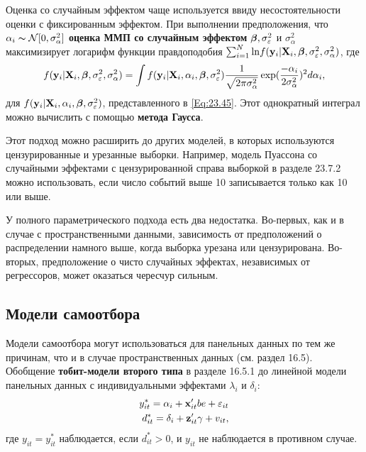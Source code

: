 Оценка со случайным эффектом чаще используется ввиду несостоятельности оценки с фиксированным эффектом. При выполнении предположения, что $\alpha_i \thicksim \mathcal{N} [0, \sigma^2_{\alpha}]$ \textbf{оценка ММП со случайным эффектом} $\bm{\beta}, \sigma^2_{\varepsilon}$ и $\sigma^2_{\alpha}$ максимизирует логарифм функции правдоподобия $\sum^N_{i=1} \mathrm{ln} f(\mathbf{y}_i |\mathbf{X}_i, \bm{\beta}, \sigma^2_{\varepsilon}, \sigma^2_{\alpha})$, где
\begin{align}
f(\mathbf{y}_i|\mathbf{X}_i, \bm{\beta}, \sigma^2_{\varepsilon}, \sigma^2_{\alpha})=
\int f(\mathbf{y}_i | \mathbf{X}_i, \alpha_i, \bm{\beta}, \sigma^2_{\varepsilon}) 
\frac{1}{\sqrt{2 \pi \sigma^2_{\alpha}}} \exp  (\frac{-\alpha_i}{2 \sigma^2_{\alpha}})^2 d \alpha_i,
\label{Eq:23.46}
\end{align}
для $f(\mathbf{y}_i |\mathbf{X}_i, \alpha_i, \bm{\beta}, \sigma^2_{\varepsilon})$, представленного в \ref{Eq:23.45}. Этот однократный интеграл можно вычислить с помощью \textbf{метода Гаусса}.

Этот подход можно расширить до других моделей, в которых используются цензурированные и урезанные выборки. Например, модель Пуассона со случайными эффектами с цензурированной справа выборкой в разделе 23.7.2 можно использовать, если число событий выше 10 записывается только как 10 или выше.

У полного параметрического подхода есть два недостатка. Во-первых, как и в случае с пространственными данными, зависимость от предположений о распределении намного выше, когда выборка урезана или цензурирована. Во-вторых, предположение о чисто случайных эффектах, независимых от регрессоров, может оказаться чересчур сильным. 

\subsection{Модели самоотбора}

Модели самоотбора могут использоваться для панельных данных по тем же причинам, что и в случае пространственных данных (см. раздел 16.5). Обобщение \textbf{тобит-модели второго типа} в разделе 16.5.1  до линейной модели панельных данных с индивидуальными эффектами $\lambda_i$ и $\delta_i$: 
\begin{align}
y^*_{it} = \alpha_i + \mathbf{x}'_{it} be +\varepsilon_{it} 
\label{Eq:23.47} \\
d^*_{it} = \delta_i+\mathbf{z}'_{it} \gamma + v_{it}, \nonumber
\end{align}
где $y_{it}=y^*_{it}$ наблюдается, если $d^*_{it} >0$, и $y_{it}$ не наблюдается в противном случае.

